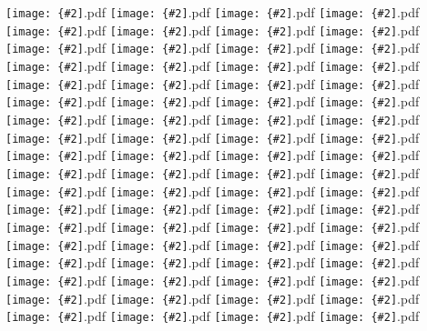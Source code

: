 \documentclass[12pt,a4paper]{article}
\newcommand{\pdffig}[2][0.5]{\texttt{[image: \{\#2]}.pdf}}
\begin{document}
\noindent\pdffig[0.5]{Correlation_Aus_tsfc_dlwr}
\pdffig[0.5]{Correlation_Aus_tsfc_dswr}
\pdffig[0.5]{Correlation_Aus_tsfc_lhf}
\pdffig[0.5]{Correlation_Aus_tsfc_precip}
\pdffig[0.5]{Correlation_Aus_tsfc_rhum}
\pdffig[0.5]{Correlation_Aus_tsfc_sfc_temp}
\pdffig[0.5]{Correlation_Aus_tsfc_shf}
\pdffig[0.5]{Correlation_Aus_tsfc_smc}
\pdffig[0.5]{Correlation_India_tsfc_dlwr}
\pdffig[0.5]{Correlation_India_tsfc_dswr}
\pdffig[0.5]{Correlation_India_tsfc_lhf}
\pdffig[0.5]{Correlation_India_tsfc_precip}
\pdffig[0.5]{Correlation_India_tsfc_rhum}
\pdffig[0.5]{Correlation_India_tsfc_sfc_temp}
\pdffig[0.5]{Correlation_India_tsfc_shf}
\pdffig[0.5]{Correlation_India_tsfc_smc}
\pdffig[0.5]{Correlation_MC_tsfc_dlwr}
\pdffig[0.5]{Correlation_MC_tsfc_dswr}
\pdffig[0.5]{Correlation_MC_tsfc_lhf}
\pdffig[0.5]{Correlation_MC_tsfc_precip}
\pdffig[0.5]{Correlation_MC_tsfc_rhum}
\pdffig[0.5]{Correlation_MC_tsfc_sfc_temp}
\pdffig[0.5]{Correlation_MC_tsfc_shf}
\pdffig[0.5]{Correlation_MC_tsfc_smc}
\pdffig[0.5]{Correlation_NthEastAfr_tsfc_dlwr}
\pdffig[0.5]{Correlation_NthEastAfr_tsfc_dswr}
\pdffig[0.5]{Correlation_NthEastAfr_tsfc_lhf}
\pdffig[0.5]{Correlation_NthEastAfr_tsfc_precip}
\pdffig[0.5]{Correlation_NthEastAfr_tsfc_rhum}
\pdffig[0.5]{Correlation_NthEastAfr_tsfc_sfc_temp}
\pdffig[0.5]{Correlation_NthEastAfr_tsfc_shf}
\pdffig[0.5]{Correlation_NthEastAfr_tsfc_smc}
\pdffig[0.5]{Correlation_NthWestAfr_tsfc_dlwr}
\pdffig[0.5]{Correlation_NthWestAfr_tsfc_dswr}
\pdffig[0.5]{Correlation_NthWestAfr_tsfc_lhf}
\pdffig[0.5]{Correlation_NthWestAfr_tsfc_precip}
\pdffig[0.5]{Correlation_NthWestAfr_tsfc_rhum}
\pdffig[0.5]{Correlation_NthWestAfr_tsfc_sfc_temp}
\pdffig[0.5]{Correlation_NthWestAfr_tsfc_shf}
\pdffig[0.5]{Correlation_NthWestAfr_tsfc_smc}
\pdffig[0.5]{Correlation_SthAfr_tsfc_dlwr}
\pdffig[0.5]{Correlation_SthAfr_tsfc_dswr}
\pdffig[0.5]{Correlation_SthAfr_tsfc_lhf}
\pdffig[0.5]{Correlation_SthAfr_tsfc_precip}
\pdffig[0.5]{Correlation_SthAfr_tsfc_rhum}
\pdffig[0.5]{Correlation_SthAfr_tsfc_sfc_temp}
\pdffig[0.5]{Correlation_SthAfr_tsfc_shf}
\pdffig[0.5]{Correlation_SthAfr_tsfc_smc}
\pdffig[0.5]{Correlation_SthSthAm_tsfc_dlwr}
\pdffig[0.5]{Correlation_SthSthAm_tsfc_dswr}
\pdffig[0.5]{Correlation_SthSthAm_tsfc_lhf}
\pdffig[0.5]{Correlation_SthSthAm_tsfc_precip}
\pdffig[0.5]{Correlation_SthSthAm_tsfc_rhum}
\pdffig[0.5]{Correlation_SthSthAm_tsfc_sfc_temp}
\pdffig[0.5]{Correlation_SthSthAm_tsfc_shf}
\pdffig[0.5]{Correlation_SthSthAm_tsfc_smc}
\pdffig[0.5]{Correlation_TropAfr_tsfc_dlwr}
\pdffig[0.5]{Correlation_TropAfr_tsfc_dswr}
\pdffig[0.5]{Correlation_TropAfr_tsfc_lhf}
\pdffig[0.5]{Correlation_TropAfr_tsfc_precip}
\pdffig[0.5]{Correlation_TropAfr_tsfc_rhum}
\pdffig[0.5]{Correlation_TropAfr_tsfc_sfc_temp}
\pdffig[0.5]{Correlation_TropAfr_tsfc_shf}
\pdffig[0.5]{Correlation_TropAfr_tsfc_smc}
\pdffig[0.5]{Correlation_TropSthAm_tsfc_dlwr}
\pdffig[0.5]{Correlation_TropSthAm_tsfc_dswr}
\pdffig[0.5]{Correlation_TropSthAm_tsfc_lhf}
\pdffig[0.5]{Correlation_TropSthAm_tsfc_precip}
\pdffig[0.5]{Correlation_TropSthAm_tsfc_rhum}
\pdffig[0.5]{Correlation_TropSthAm_tsfc_sfc_temp}
\pdffig[0.5]{Correlation_TropSthAm_tsfc_shf}
\pdffig[0.5]{Correlation_TropSthAm_tsfc_smc}
\end{document}
